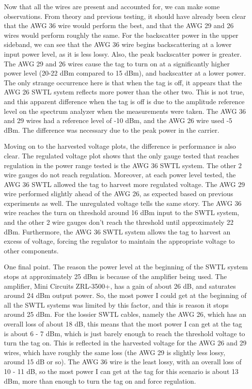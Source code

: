 \documentclass[12pt,onecolumn,titlepage]{article}
\begin{document}
Now that all the wires are present and accounted for, we can make some observations. From theory and previous testing, it should have already been clear that the AWG 36 wire would perform the best, and that the AWG 29 and 26 wires would perform roughly the same. For the backscatter power in the upper sideband, we can see that the AWG 36 wire begins backscattering at a lower input power level, as it is less lossy. Also, the peak backscatter power is greater. The AWG 29 and 26 wires cause the tag to turn on at a significantly higher power level (20-22 dBm compared to 15 dBm), and backscatter at a lower power. The only strange occurrence here is that when the tag is off, it appears that the AWG 26 SWTL system reflects more power than the other two. This is not true, and this apparent difference when the tag is off is due to the amplitude reference level on the spectrum analyzer when the measurements were taken. The AWG 36 and 29 wires had a reference level of -10 dBm, and the AWG 26 wire used -5 dBm. The difference was necessary due to the peak power in the carrier. 

Moving on to the harvested voltage plots, the difference is performance is also clear. The regulated voltage plot shows that the only gauge tested that reaches regulation in the power range tested is the AWG 36 SWTL system. The other 2 wire gauges do not reach regulation. Moreover, at each power level tested, the AWG 36 SWTL allowed the tag to harvest more regulated voltage. The AWG 29 wire performed slightly ahead of the AWG 26, as expected based on previous experiments as well. The unregulated voltage tells the same story. The AWG 36 wire reaches the turn on threshold around 16 dBm input to the SWTL system, and the other 2 wire gauges don't reach the threshold until approximately 22 dBm. Furthermore, the AWG 36 SWTL system allows the tag to harvest an excess of voltage, forcing the regulator to maintain the appropriate voltage to other components. 

One final point. The reason the power level at the beginning of the SWTL system stops at approximately 25 dBm is because of the amplifier being used. The amplifier, Mini Circuits ZRL-3500+, has a gain of about 26 dB, and saturates around 24 dBm output power. So, the most power I could get at the beginning of all the SWTL systems was limited by this factor, and this is reason it stops around 25 dBm. For the lossier SWTL cables, namely the AWG 26, which has an overall loss of about 18 dB, this means that the most power I can get at the tag is about 6 - 7 dBm, which is just barely enough to reach the threshold voltage to turn the tag on. This is reflected in the harvested voltage for the AWG 26 and 29 wires, which have roughly the same loss (the AWG 29 is slightly less lossy, around 15 dB or so). The AWG 36 wire is the least lossy, with an overall loss of 10 - 11 dB, so the most power I can get at the tag for this scenario is about 13 dBm, more than enough to turn the tag on and force regulation. 
\end{document}
